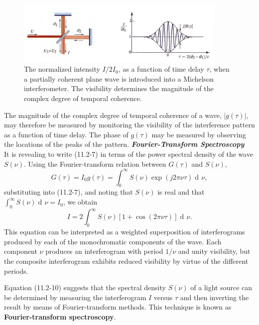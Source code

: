 \documentclass{article}
\numberwithin{figure}{subsection}
\numberwithin{table}{subsection}
\DeclareMathOperator\dif{d\!}
\begin{document}
 \begin{figure}[H]
\centering
\includegraphics[width=0.9\textwidth]{11_2_2.PNG}
\caption{The normalized intensity $ I / 2I_0 $, as a function of time delay $ \tau $, when a partially coherent plane wave is introduced into a Michelson interferometer. The visibility determines the magnitude of the complex degree of temporal coherence.}
\label{fig: 11_2_2}
\end{figure}
\par The magnitude of the complex degree of temporal coherence of a wave, $\lvert g(\tau) \rvert $, may therefore be measured by monitoring the visibility of the interference pattern as a function of time delay. The phase of $ g(\tau) $ may be measured by observing the locations of the peaks of the pattern.
\bigbreak\noindent\textcolor{ksc}{\textbf{\textsl{Fourier-Transform Spectroscopy}}}\\
It is revealing to write (11.2-7) in terms of the power spectral density of the wave $ S(\nu) $. Using the Fourier-transform relation between $ G(\tau) $ and $ S(\nu) $,
\begin{equation}
G(\tau) = I_0 g(\tau) = \int_0^\infty S(\nu) \exp(j2\pi\nu\tau) \dif \nu ,
\end{equation}
substituting into (11.2-7), and noting that $ S(\nu) $ is real and that $ \int_0^\infty S(\nu) \dif \nu = I_0 $, we obtain
\begin{equation}
I = 2\int_0^\infty S(\nu) [1 + \cos(2\pi\nu\tau)] \dif \nu .
\end{equation}
This equation can be interpreted as a weighted superposition of interferograms produced by each of the monochromatic components of the wave. Each component $ \nu $ produces an interferogram with period $ 1 / \nu $ and unity visibility, but the composite interferogram exhibits reduced visibility by virtue of the different periods.
\par Equation (11.2-10) suggests that the spectral density $ S(\nu) $ of a light source can be determined by measuring the interferogram $ I $ versus $ \tau $ and then inverting the result by means of Fourier-transform methods. This technique is known as \textbf{Fourier-transform spectroscopy}.
\end{document}
